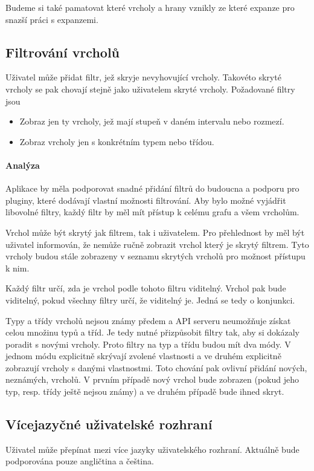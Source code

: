 Budeme si také pamatovat které vrcholy a hrany vznikly ze které expanze pro snazší práci s expanzemi.

\subsection*{Filtrování vrcholů}
Uživatel může přidat filtr, jež skryje nevyhovující vrcholy. Takovéto skryté vrcholy se pak chovají stejně jako uživatelem skryté vrcholy. Požadované filtry jsou
\begin{itemize}
    \item Zobraz jen ty vrcholy, jež mají stupeň v daném intervalu nebo rozmezí.
    \item Zobraz vrcholy jen s konkrétním typem nebo třídou.
\end{itemize}

\paragraph{Analýza} Aplikace by měla podporovat snadné přidání filtrů do budoucna a podporu pro pluginy, které dodávají vlastní možnosti filtrování. Aby bylo možné vyjádřit libovolné filtry, každý filtr by měl mít přístup k celému grafu a všem vrcholům.

Vrchol může být skrytý jak filtrem, tak i uživatelem. Pro přehlednost by měl být uživatel informován, že nemůže ručně zobrazit vrchol který je skrytý filtrem. Tyto vrcholy budou stále zobrazeny v seznamu skrytých vrcholů pro možnost přístupu k nim.

Každý filtr určí, zda je vrchol podle tohoto filtru viditelný. Vrchol pak bude viditelný, pokud všechny filtry určí, že viditelný je. Jedná se tedy o konjunkci.

Typy a třídy vrcholů nejsou známy předem a API serveru neumožňuje získat celou množinu typů a tříd. Je tedy nutné přizpůsobit filtry tak, aby si dokázaly poradit s novými vrcholy. Proto filtry na typ a třídu budou mít dva módy. V jednom módu explicitně skrývají zvolené vlastnosti a ve druhém explicitně zobrazují vrcholy s danými vlastnostmi. Toto chování pak ovlivní přidání nových, neznámých, vrcholů. V prvním případě nový vrchol bude zobrazen (pokud jeho typ, resp. třídy ještě nejsou známy) a ve druhém případě bude ihned skryt.

\subsection*{Vícejazyčné uživatelské rozhraní}
Uživatel může přepínat mezi více jazyky uživatelského rozhraní. Aktuálně bude podporována pouze angličtina a čeština.

